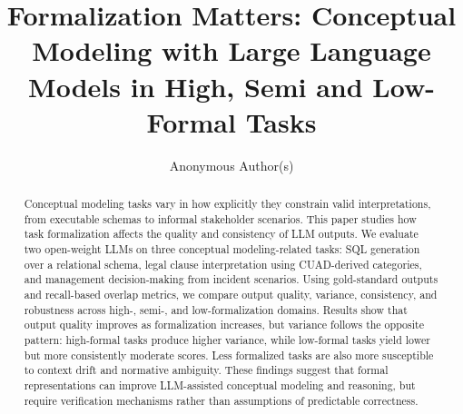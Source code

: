 \documentclass[runningheads]{llncs}
\title{
%
%
Formalization Matters: Conceptual Modeling with Large Language Models in High, Semi and Low-Formal Tasks
}
\author{Anonymous Author(s)}
\institute{Anonymous Institution(s)\\
\email{anonymous@domain.com}}
\begin{document}
\maketitle

\begin{abstract}

Conceptual modeling tasks vary in how explicitly they constrain valid interpretations, from executable schemas to informal stakeholder scenarios. This paper studies how task formalization affects the quality and consistency of LLM outputs. We evaluate two open-weight LLMs on three conceptual modeling-related tasks: SQL generation over a relational schema, legal clause interpretation using CUAD-derived categories, and management decision-making from incident scenarios. Using gold-standard outputs and recall-based overlap metrics, we compare output quality, variance, consistency, and robustness across high-, semi-, and low-formalization domains. Results show that output quality improves as formalization increases, but variance follows the opposite pattern: high-formal tasks produce higher variance, while low-formal tasks yield lower but more consistently moderate scores. Less formalized tasks are also more susceptible to context drift and normative ambiguity. These findings suggest that formal representations can improve LLM-assisted conceptual modeling and reasoning, but require verification mechanisms rather than assumptions of predictable correctness.



\end{abstract}
\end{document}
